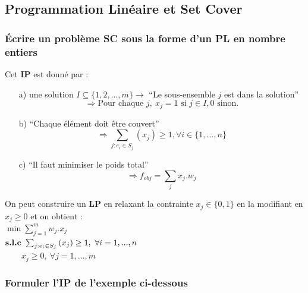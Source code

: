 \documentclass{article}
\newcommand{\titre}[1]{\textcolor{title}{#1}}
\begin{document}
\begin{sffamily}
\subsection{Programmation Linéaire et Set Cover}

\subsubsection*{Écrire un problème \textbf{\titre{SC}} sous la forme d'un \textbf{\titre{PL}} en nombre entiers}

Cet \textbf{IP} est donné par :
\begin{enumerate}
\item[a)] une solution $I \subseteq \{ 1,2,...,m\} \rightarrow $ ``Le sous-ensemble $j$ est dans la solution'' \\
$$\Rightarrow \text{Pour chaque } j,\ x_j = 1 \text{ si } j \in I, 0 \text{ sinon}.$$
\item[b)] ``Chaque élément doit être couvert'' \\
$$\Rightarrow \sum_{j:e_i\in S_j}{(x_j) \geq 1}, \forall i \in \{1,...,n\}$$
\item[c)] ``Il faut minimiser le poids total''\\
$$\Rightarrow f_{obj} = \sum_j{x_j.w_j}$$
\end{enumerate}

On peut construire un \textbf{LP} en relaxant la contrainte $x_j \in \{0,1\}$ en la modifiant en $x_j \geq 0$ et on obtient : \\
$\min \sum_{j=1}^m{w_j.x_j}$ \\
\indent $\text{\textbf{s.l.c} } \sum_{j:e_i \in S_j}{(x_j)} \geq 1,\ \forall i = 1, ..., n$ \\
\indent $\qquad x_j \geq 0,\ \forall j = 1,...,m$

\subsubsection*{Formuler l'\titre{IP} de l'exemple ci-dessous}


\end{sffamily}
\end{document}
